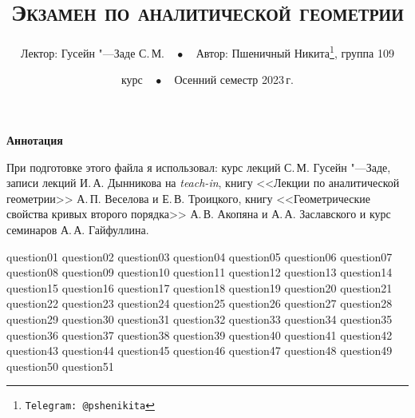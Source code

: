 \documentclass[a4paper, 11pt]{article}
\begin{document}
\title{\bfseries\scshape Экзамен по аналитической геометрии}
\author{Лектор: Гусейн "---Заде С.\,М.$\quad\bullet\quad$Автор: Пшеничный Никита\thanks{\texttt{Telegram: @pshenikita}}, группа 109}
\date{ курс$\quad\bullet\quad$Осенний семестр 2023\,г.}

\maketitle

\begin{center}
    \textbf{\sffamily Аннотация}

    При подготовке этого файла я использовал: курс лекций С.\,М. Гусейн "---Заде, записи лекций И.\,А. Дынникова на \textit{teach-in}, книгу <<Лекции по аналитической геометрии>> А.\,П. Веселова и Е.\,В. Троицкого, книгу <<Геометрические свойства кривых второго порядка>> А.\,В. Акопяна и А.\,А. Заславского и курс семинаров А.\,А. Гайфуллина.
\end{center}

\tableofcontents

{question01}
{question02}
{question03}
{question04}
{question05}
{question06}
{question07}
{question08}
{question09}
{question10}
{question11}
{question12}
{question13}
{question14}
{question15}
{question16}
{question17}
{question18}
{question19}
{question20}
{question21}
{question22}
{question23}
{question24}
{question25}
{question26}
{question27}
{question28}
{question29}
{question30}
{question31}
{question32}
{question33}
{question34}
{question35}
{question36}
{question37}
{question38}
{question39}
{question40}
{question41}
{question42}
{question43}
{question44}
{question45}
{question46}
{question47}
{question48}
{question49}
{question50}
{question51}
\end{document}
